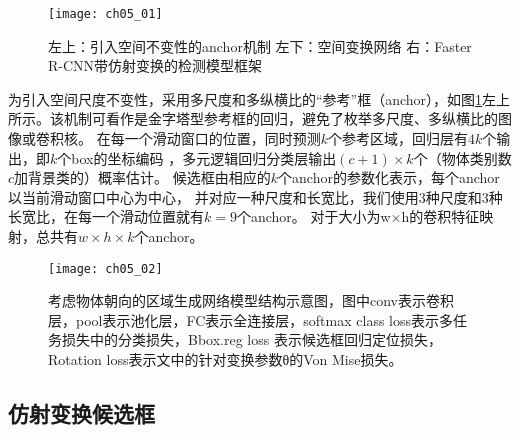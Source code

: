 \begin{figure}[!htbp]
\centering
\texttt{[image: ch05\_01]}
\caption[区域生成网络模型的各个组件图]{左上：引入空间不变性的anchor机制 左下：空间变换网络  右：Faster R-CNN带仿射变换的检测模型框架}
\label{fig:ch05_01}
\end{figure}

为引入空间尺度不变性，采用多尺度和多纵横比的“参考”框（anchor），如图\ref{fig:ch05_01}左上所示。该机制可看作是金字塔型参考框的回归，避免了枚举多尺度、多纵横比的图像或卷积核。
在每一个滑动窗口的位置，同时预测$k$个参考区域，回归层有$4k$个输出，即$k$个box的坐标编码
，多元逻辑回归分类层输出$(c+1)×k$个（物体类别数$c$加背景类的）概率估计。
候选框由相应的$k$个anchor的参数化表示，每个anchor以当前滑动窗口中心为中心，
并对应一种尺度和长宽比，我们使用3种尺度和3种长宽比，在每一个滑动位置就有$k=9$个anchor。
对于大小为w×h的卷积特征映射，总共有$w \times h\times k$个anchor。

\begin{figure}[!htbp]
\centering
\texttt{[image: ch05\_02]}
\caption[考虑物体朝向的区域生成网络模型结构示意图]{考虑物体朝向的区域生成网络模型结构示意图，图中conv表示卷积层，pool表示池化层，FC表示全连接层，softmax class loss表示多任务损失中的分类损失，Bbox.reg loss 表示候选框回归定位损失，Rotation loss表示文中的针对变换参数θ的Von Mise损失。}
\label{fig:ch05_02}
\end{figure} 

\subsection{仿射变换候选框}
 
